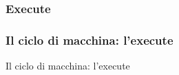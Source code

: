 \subsubsection[Execute]{Execute}
\begin{frame}
	\frametitle{Il ciclo di macchina: l'execute}
	
	\begin{block}{Il ciclo di macchina: l'execute}	
	\end{block}
	
\end{frame}

